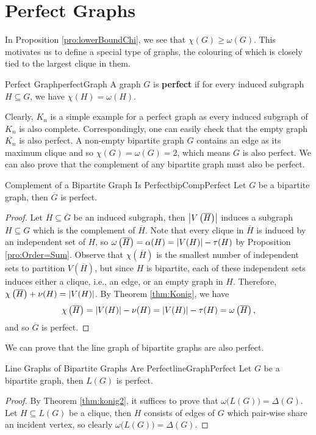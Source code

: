 \documentclass[math, code]{amznotes}
\theoremstyle{remark}
\begin{document}
\section{Perfect Graphs}
In Proposition \ref{pro:lowerBoundChi}, we see that $\chi(G) \geq \omega(G)$. This motivates us to define a special type of graphs, the colouring of which is closely tied to the largest clique in them.
\begin{dfnbox}{Perfect Graph}{perfectGraph}
    A graph $G$ is {\color{red} \textbf{perfect}} if for every induced subgraph $H \subseteq G$, we have $\chi(H) = \omega(H)$.
\end{dfnbox}
Clearly, $K_n$ is a simple example for a perfect graph as every induced subgraph of $K_n$ is also complete. Correspondingly, one can easily check that the empty graph $\overline{K_n}$ is also perfect. A non-empty bipartite graph $G$ contains an edge as its maximum clique and so $\chi(G) = \omega(G) = 2$, which means $G$ is also perfect. We can also prove that the complement of any bipartite graph must also be perfect.
\begin{probox}{Complement of a Bipartite Graph Is Perfect}{bipCompPerfect}
    Let $G$ be a bipartite graph, then $\overline{G}$ is perfect.
    \tcblower
    \begin{proof}
        Let $\overline{H} \subseteq \overline{G}$ be an induced subgraph, then ${\left\lvert {V\left(\overline{H}\right)} \right\rvert}$ induces a subgraph $H \subseteq G$ which is the complement of $\overline{H}$. Note that every clique in $\overline{H}$ is induced by an independent set of $H$, so $\omega\left(\overline{H}\right) = \alpha(H) = {\left\lvert {V(H)} \right\rvert} - \tau(H)$ by Proposition \ref{pro:Order=Sum}. Observe that $\chi\left(\overline{H}\right)$ is the smallest number of independent sets to partition $V\left(\overline{H}\right)$, but since $H$ is bipartite, each of these independent sets induces either a clique, i.e., an edge, or an empty graph in $H$. Therefore, $\chi\left(\overline{H}\right) + \nu(H) = {\left\lvert {V(H)} \right\rvert}$. By Theorem \ref{thm:Konig}, we have 
        \begin{equation*}
            \chi\left(\overline{H}\right) = {\left\lvert {V(H)} \right\rvert} - \nu(H) = {\left\lvert {V(H)} \right\rvert} - \tau(H) = \omega\left(\overline{H}\right),
        \end{equation*}
        and so $\overline{G}$ is perfect.
    \end{proof}
\end{probox}
We can prove that the line graph of bipartite graphs are also perfect.
\begin{probox}{Line Graphs of Bipartite Graphs Are Perfect}{lineGraphPerfect}
    Let $G$ be a bipartite graph, then $L(G)$ is perfect.
    \tcblower
    \begin{proof}
        By Theorem \ref{thm:konig2}, it suffices to prove that $\omega\bigl(L(G)\bigr) = \Delta(G)$. Let $H \subseteq L(G)$ be a clique, then $H$ consists of edges of $G$ which pair-wise share an incident vertex, so clearly $\omega\bigl(L(G)\bigr) = \Delta(G)$.
    \end{proof}
\end{probox}
\end{document}
